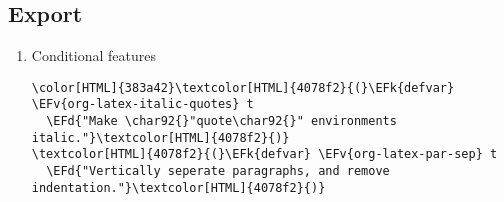 \documentclass{scrartcl}
\newcommand{\EFk}[1]{\textcolor{EFk}{#1}} %
\newcommand{\EFd}[1]{\textcolor{EFd}{\textit{#1}}} %
\newcommand{\EFv}[1]{\textcolor{EFv}{#1}} %
\begin{document}
\subsection{Export}
\label{sec:org248ec0b}
\begin{enumerate}
\item Conditional features
\label{sec:orgc3c5656}

\begin{Code}
\begin{Verbatim}[]
\color[HTML]{383a42}\textcolor[HTML]{4078f2}{(}\EFk{defvar} \EFv{org-latex-italic-quotes} t
  \EFd{"Make \char92{}"quote\char92{}" environments italic."}\textcolor[HTML]{4078f2}{)}
\textcolor[HTML]{4078f2}{(}\EFk{defvar} \EFv{org-latex-par-sep} t
  \EFd{"Vertically seperate paragraphs, and remove indentation."}\textcolor[HTML]{4078f2}{)}


\end{Verbatim}
\end{Code}
\end{enumerate}
\end{document}
